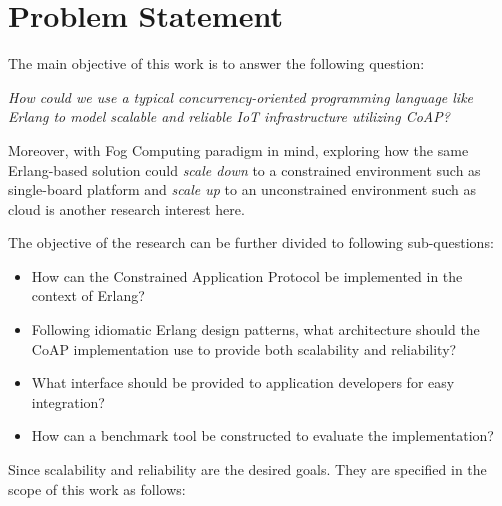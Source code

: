 \chapter{Problem Statement}\label{ch2}



The main objective of this work is to answer the following question:

\textit{How could we use a typical concurrency-oriented programming language like Erlang to model scalable and reliable IoT infrastructure utilizing CoAP?}

Moreover, with Fog Computing paradigm in mind, exploring how the same Erlang-based solution could \textit{scale down} to a constrained environment such as single-board platform and \textit{scale up} to an unconstrained environment such as cloud is another research interest here.

The objective of the research can be further divided to following sub-questions:

\begin{itemize}

\item How can the Constrained Application Protocol be implemented in the context of Erlang? 
\item Following idiomatic Erlang design patterns, what architecture should the CoAP implementation use to provide both scalability and reliability? 
\item What interface should be provided to application developers for easy integration? 
\item How can a benchmark tool be constructed to evaluate the implementation? 

\end{itemize}

Since scalability and reliability are the desired goals. They are specified in the scope of this work as follows:

